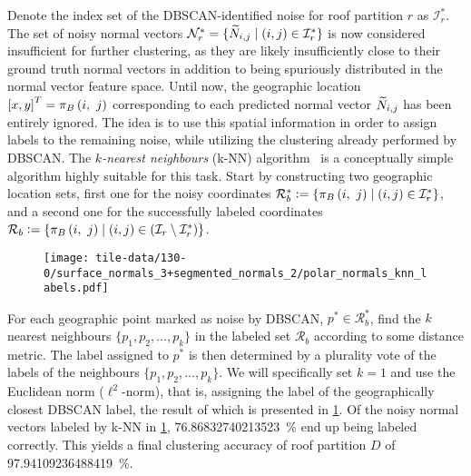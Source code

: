 Denote the index set of the DBSCAN-identified noise for roof partition $r$ as $\mathcal{I}_r^*$.
The set of noisy normal vectors $\mathcal{N}_r^* = \{\widetilde{N}_{i,j} \mid (i, j) \in \mathcal{I}_r^*\}$ is now considered insufficient for further clustering, as they are likely insufficiently close to their ground truth normal vectors in addition to being spuriously distributed in the normal vector feature space.
Until now, the geographic location ${[x, y]}^T = \pi_{B}\left(i,~j\right)$ corresponding to each predicted normal vector $\widetilde{N}_{i,j}$ has been entirely ignored.
The idea is to use this spatial information in order to assign labels to the remaining noise, while utilizing the clustering already performed by DBSCAN.
The \textit{$k$-nearest neighbours} (k-NN) algorithm~\cite{knn} is a conceptually simple algorithm highly suitable for this task.
Start by constructing two geographic location sets, first one for the noisy coordinates $\mathcal{R}_b^* \vcentcolon= \{\pi_{B}\left(i,~j\right) \mid (i, j) \in \mathcal{I}_r^* \}$, and a second one for the successfully labeled coordinates $\mathcal{R}_b \vcentcolon= \{\pi_{B}\left(i,~j\right) \mid (i, j) \in (\mathcal{I}_r \setminus \mathcal{I}_r^*)\}$.
\begin{wrapfigure}[15]{r}{0.35\textwidth}
  \vspace{-2em}
  \begin{center}
    \texttt{[image: tile-data/130-0/surface\_normals\_3+segmented\_normals\_2/polar\_normals\_knn\_labels.pdf]}
  \end{center}
  \label{fig:polar-normal-knn-labels}
\end{wrapfigure}
For each geographic point marked as noise by DBSCAN, $p^* \in \mathcal{R}_b^*$, find the $k$ nearest neighbours $\{p_1, p_2, \ldots, p_k\}$ in the labeled set $\mathcal{R}_b$ according to some distance metric.
The label assigned to $p^*$ is then determined by a plurality vote of the labels of the neighbours $\{p_1, p_2, \ldots, p_k\}$.
We will specifically set $k = 1$ and use the Euclidean norm ($\ell^2$-norm), that is, assigning the label of the geographically closest DBSCAN label, the result of which is presented in \cref{fig:polar-normal-knn-labels}.
Of the noisy normal vectors labeled by k-NN in \cref{fig:polar-normal-knn-labels}, \SI[round-mode=places,round-precision=1]{76.86832740213523}{\percent} end up being labeled correctly.
This yields a final clustering accuracy of roof partition $D$ of \SI[round-mode=places,round-precision=1]{97.94109236488419}{\percent}.
